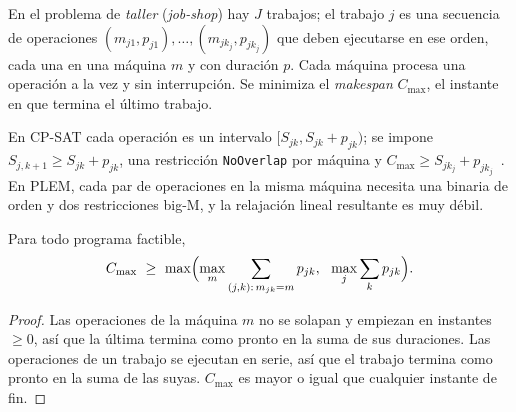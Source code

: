 \begin{definicion}\label{def:jobshop}
En el problema de \emph{taller} (\emph{job-shop}) hay $J$ trabajos; el trabajo $j$ es una secuencia de operaciones $(m_{j1},p_{j1}),\dots,(m_{jk_j},p_{jk_j})$ que deben ejecutarse en ese orden, cada una en una máquina $m$ y con duración $p$. Cada máquina procesa una operación a la vez y sin interrupción. Se minimiza el \emph{makespan} $C_{\max}$, el instante en que termina el último trabajo.
\end{definicion}

En CP-SAT cada operación es un intervalo $[S_{jk},S_{jk}+p_{jk})$; se impone $S_{j,k+1}\ge S_{jk}+p_{jk}$, una restricción \texttt{NoOverlap} por máquina y $C_{\max}\ge S_{jk_j}+p_{jk_j}$~\cite{ortools-js}. En PLEM, cada par de operaciones en la misma máquina necesita una binaria de orden y dos restricciones big-M, y la relajación lineal resultante es muy débil.

\begin{proposicion}\label{prop:cota-ms}
Para todo programa factible,
\[
C_{\max}\ \ge\ \max\Bigl(\max_{m}\sum_{(j,k):\,m_{jk}=m}p_{jk},\ \ \max_j\sum_{k}p_{jk}\Bigr).
\]
\end{proposicion}

\begin{proof}
Las operaciones de la máquina $m$ no se solapan y empiezan en instantes $\ge 0$, así que la última termina como pronto en la suma de sus duraciones. Las operaciones de un trabajo se ejecutan en serie, así que el trabajo termina como pronto en la suma de las suyas. $C_{\max}$ es mayor o igual que cualquier instante de fin.
\end{proof}

